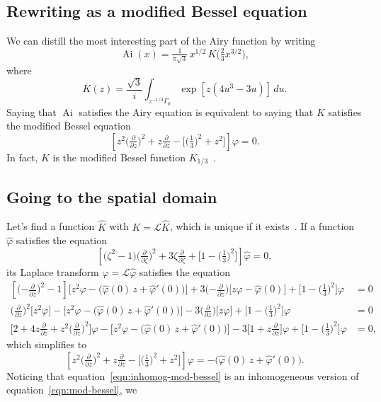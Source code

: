 \documentclass{article}
\theoremstyle{definition}
\theoremstyle{plain}
\newcommand{\laplace}{\mathcal{L}}
\DeclareMathOperator{\Ai}{Ai}
\begin{document}
\subsection{Rewriting as a modified Bessel equation}
We can distill the most interesting part of the Airy function by writing
\[ \Ai(x) = \tfrac{1}{\pi\sqrt{3}}\,x^{1/2}\, K\big(\tfrac{2}{3} x^{3/2}\big), \]
where
\[ K(z) = \frac{\sqrt{3}}{i} \int_{z^{-1/3}\Gamma_0} \exp\left[z \left(4u^3 - 3u\right)\right]\,du. \]
Saying that $\Ai$ satisfies the Airy equation is equivalent to saying that $K$ satisfies the modified Bessel equation
\begin{equation}\label{eqn:mod-bessel}
\left[z^2 \big(\tfrac{\partial}{\partial z}\big)^2 + z \tfrac{\partial}{\partial z} - \big[\big(\tfrac{1}{3}\big)^2 + z^2\big]\right] \varphi = 0.
\end{equation}
In fact, $K$ is the modified Bessel function $K_{1/3}$~\cite[equation~9.6.1]{dlmf}.
\subsection{Going to the spatial domain}
Let's find a function $\hat{K}$ with $K = \laplace \hat{K}$, which is unique if it exists~\cite[Theorem~1.23]{laplace-tfm}. If a function $\hat{\varphi}$ satisfies the equation
\begin{equation}\label{eqn:spatial-mod-bessel}
\left[\big(\zeta^2 - 1\big) \big(\tfrac{\partial}{\partial \zeta}\big)^2 + 3\zeta \tfrac{\partial}{\partial \zeta} + \big[1 - \big(\tfrac{1}{3}\big)^2\big]\right] \hat{\varphi} = 0,
\end{equation}
its Laplace transform $\varphi = \laplace \hat{\varphi}$ satisfies the equation
\begin{align*}
\left[\big({-\tfrac{\partial}{\partial z}}\big)^2 - 1\right] \Big[z^2 \varphi - \Big(\hat{\varphi}(0)\,z + \hat{\varphi}'(0)\Big)\Big] + 3\big({-\tfrac{\partial}{\partial z}}\big)\Big[z\varphi - \hat{\varphi}(0)\Big] + \big[1 - \big(\tfrac{1}{3}\big)^2\big] \varphi & = 0 \\
\big(\tfrac{\partial}{\partial z}\big)^2 \big[z^2 \varphi\big] - \Big[z^2 \varphi - \Big(\hat{\varphi}(0)\,z + \hat{\varphi}'(0)\Big)\Big] - 3\big(\tfrac{\partial}{\partial z}\big)\big[z\varphi\big] + \big[1 - \big(\tfrac{1}{3}\big)^2\big] \varphi & = 0 \\
\Big[2 + 4z\tfrac{\partial}{\partial z} + z^2\big(\tfrac{\partial}{\partial z}\big)^2\Big]\varphi - \Big[z^2 \varphi - \Big(\hat{\varphi}(0)\,z + \hat{\varphi}'(0)\Big)\Big] - 3\Big[1 + z\tfrac{\partial}{\partial z}\Big]\varphi + \big[1 - \big(\tfrac{1}{3}\big)^2\big] \varphi & = 0,
\end{align*}
which simplifies to
\begin{equation}\label{eqn:inhomog-mod-bessel}
\left[z^2 \big(\tfrac{\partial}{\partial z}\big)^2 + z \tfrac{\partial}{\partial z} - \big[\big(\tfrac{1}{3}\big)^2 + z^2\big]\right] \varphi = -\Big(\hat{\varphi}(0)\,z + \hat{\varphi}'(0)\Big).
\end{equation}
Noticing that equation~\ref{eqn:inhomog-mod-bessel} is an inhomogeneous version of equation~\ref{eqn:mod-bessel}, we
\end{document}
